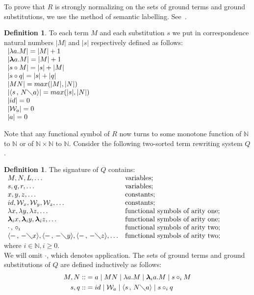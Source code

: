 \documentclass[11pt]{amsart}
\theoremstyle{plain}
\theoremstyle{definition}
\newtheorem{definition}[theorem]{Definition}
\theoremstyle{remark}
\numberwithin{equation}{section}
\newcommand{\ci}{\circ}
\newcommand{\mi}{\,,\,}
\newcommand{\is}{\diagdown}
\newcommand{\la}{\langle}
\newcommand{\ra}{\rangle}
\newcommand{\x}{a}
\renewcommand{\pi}{\mathcal{W}}
\begin{document}
To prove that $R$ is strongly normalizing on the sets of ground
terms and ground substitutions, we use the method of semantic
labelling. See~\cite{Zantema}.
\begin{definition}
To each term $M$ and each substitution $s$ we put in correspondence  natural numbers  $|M|$ and $|s|$ respectively defined as follows:\\
$\begin{array}{l}
|\lambda \x.M|=|M|+1\\
|\boldsymbol{\lambda} \x.M|=|M|+1\\
|s\ci M|=|s|+|M|\\
|s\ci
q|=|s|+|q|\\
|MN|=max(|M|,|N|)\\
|\la s\mi N\is
\x\ra|=max(|s|,|N|)\\
|id|=0\\
|\pi_{\x}|=0\\
 |\x|=0
 \end{array}$
\end{definition}
Note that any functional symbol of $R$ now turns to some
 monotone function of $\mathbb{N}$ to
$\mathbb{N}$ or of $\mathbb{N}\times\mathbb{N}$ to $\mathbb{N}$.
Consider  the following two-sorted term rewriting system $Q$.
\begin{definition} The
signature
of $Q$ contains:\\
$
\begin{array}{ll}
M,N,L,\ldots & \text{variables};\\
s,q,r,\ldots & \text{variables};\\
x,y,z,\ldots & \text{constants};\\
id,\pi_x,\pi_y,\pi_z,\ldots &\text{constants};\\
\lambda x,\lambda y,\lambda z,\ldots & \text{functional symbols of
arity one};\\
\boldsymbol{\lambda}_i x,\boldsymbol{\lambda}_i
y,\boldsymbol{\lambda}_i z,\ldots
& \text{functional symbols of arity one};\\
\cdot\mi\circ_i & \text{functional symbols of arity two};\\
\la -\mi -\is x\ra,\la -\mi -\is y\ra,\la -\mi -\is z\ra,\ldots &
\text{functional symbols of arity two};
\end{array}
$ \\[5pt]
where $i\in \mathbb{N},i\geqslant 0$.\\[5pt]
 We will
omit $\cdot$, which denotes application. The sets of ground terms
and ground substitutions of $Q$ are defined inductively as
follows:
\begin{align*}
M,N::&= \x \mid  MN \mid \lambda \x. M \mid\boldsymbol{\lambda}_i \x. M\mid s\ci_i M \\
s,q::&= id \mid \pi_{\x} \mid \langle s\mi  N\is \x \rangle \mid
s\ci_i q
\end{align*}
\end{definition}
\end{document}
